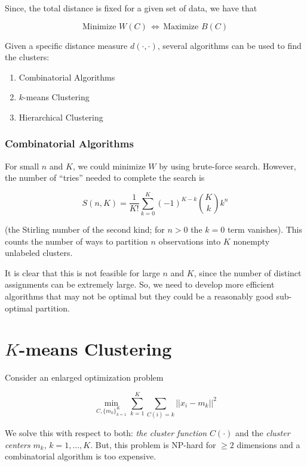 \documentclass[
]{book}
\newcounter{none} %
\begin{document}
Since, the total distance is fixed for a given set of data, we have that

\[\text{Minimize } W(C) \, \Leftrightarrow \, \text{Maximize } B(C)\]

Given a specific distance measure \(d(\cdot, \cdot)\), several algorithms can
be used to find the clusters:

\begin{enumerate}
\def\labelenumi{\roman{enumi}.}
\item
  Combinatorial Algorithms
\item
  \(k\)-means Clustering
\item
  Hierarchical Clustering
\end{enumerate}

\subsubsection*{Combinatorial Algorithms}\label{combinatorial-algorithms}

For small \(n\) and \(K\), we could minimize \(W\) by using brute-force search. However, the number of ``tries'' needed to complete the search is

\[S(n,K) = \frac{1}{K!} \sum_{k=0}^{K} (-1)^{K-k} \binom{K}{k} k^n\]

(the Stirling number of the second kind; for \(n>0\) the \(k=0\) term vanishes). This counts the number of ways to partition \(n\) observations into \(K\) nonempty unlabeled clusters.

It is clear that this is not feasible for large \(n\) and \(K\), since the number of distinct assignments can be extremely large. So, we need to develop more efficient algorithms that may not be optimal but they could be a reasonably good sub-optimal partition.

\section{\texorpdfstring{\(K\)-means Clustering}{K-means Clustering}}\label{k-means-clustering}

Consider an enlarged optimization problem

\[\min_{C, \{m_k\}_{k=1}^{K}} \sum_{k=1}^{K} \sum_{C(i)=k} ||x_i - m_k||^2\]

We solve this with respect to both: \emph{the cluster function} \(C(\cdot)\) and the \emph{cluster centers} \(m_k\), \(k=1,\ldots, K\). But, this problem is NP-hard for \(\geq 2\) dimensions and a combinatorial algorithm is too expensive.
\end{document}
